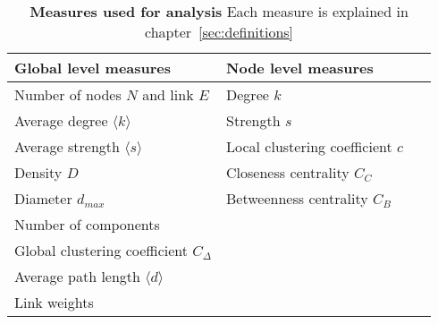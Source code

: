 \begin{table}
\small
\centering
\caption[Measures used for analysis]{\textbf{Measures used for analysis} Each measure is explained in chapter~\ref{sec:definitions}}
\vspace*{5mm}
\begin{tabularx}{\textwidth}{p{0.5\linewidth}p{0.5\linewidth}}
\toprule
\textbf{Global level measures} & \textbf{Node level measures}\\
\midrule
Number of nodes $N$ and link $E$ & Degree $k$ \\
Average degree $\langle k \rangle$ &  Strength $s$\\
Average strength $\langle s \rangle$ &   Local clustering coefficient $c$\\
Density $D$ & Closeness centrality $C_C$ \\
Diameter $d_{max}$ & Betweenness centrality $C_B$\\
Number of components & \\
Global clustering coefficient $C_{\Delta}$ &  \\
Average path length $\langle d \rangle$ & \\
Link weights & \\

\bottomrule
\end{tabularx}
\label{tab:netprop}
\end{table}
